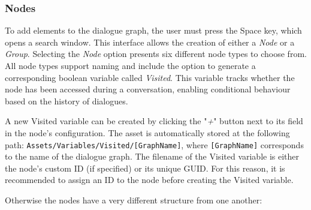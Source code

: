 \subsubsection{Nodes}
To add elements to the dialogue graph, the user must press the Space key, which opens a search window. This interface allows the creation of either a \textit{Node} or a \textit{Group}. Selecting the \textit{Node} option presents six different node types to choose from. All node types support naming and include the option to generate a corresponding boolean variable called \textit{Visited}. This variable tracks whether the node has been accessed during a conversation, enabling conditional behaviour based on the history of dialogues.

A new Visited variable can be created by clicking the "\textit{+}" button next to its field in the node's configuration. The asset is automatically stored at the following path: \verb|Assets/Variables/Visited/[GraphName]|, where \verb|[GraphName]| corresponds to the name of the dialogue graph. The filename of the Visited variable is either the node’s custom ID (if specified) or its unique GUID. For this reason, it is recommended to assign an ID to the node before creating the Visited variable.

Otherwise the nodes have a very different structure from one another:

